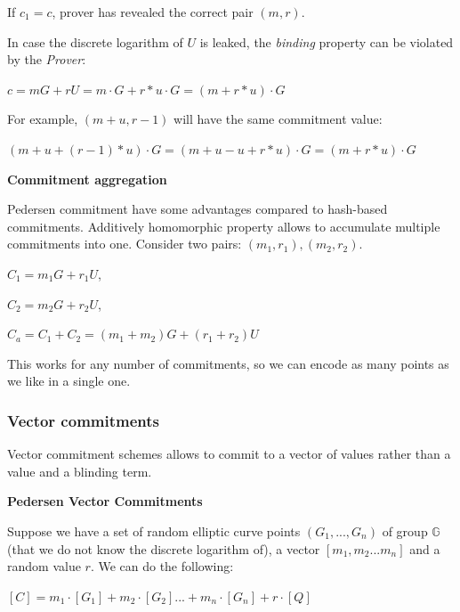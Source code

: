 \documentclass[../lecture-notes.tex]{subfiles}
\begin{document}
If $c_1 = c$, prover has revealed the correct pair $(m, r)$.

\begin{remark}
    In case the discrete logarithm of $U$ is leaked, the \textit{binding} property can be violated by the \textit{Prover}:

    $c = mG + rU = m \cdot G + r*u \cdot G = (m + r*u) \cdot G$
    
    For example, $(m + u, r - 1)$ will have the same commitment value:

    $(m+u + (r-1)*u) \cdot G = (m + u - u + r*u) \cdot G = (m + r*u) \cdot G$ 
        
\end{remark}

\textbf{Commitment aggregation}

Pedersen commitment have some advantages compared to hash-based commitments.
Additively homomorphic property allows to accumulate multiple commitments into one.
Consider two pairs: $(m_1, r_1), (m_2, r_2)$.

\begin{center}
    $C_1 = m_1G + r_1U$,

    $C_2 = m_2G + r_2U$,

    $C_a = C_1 + C_2 = (m_1 + m_2)G + (r_1 + r_2)U$
\end{center}

This works for any number of commitments, so we can encode as many points as we like in a single one.

\vspace{0.5 cm}

\subsubsection{Vector commitments}

Vector commitment schemes allows to commit to a vector of values rather than a value and a blinding term.

\vspace{0.5 cm}

\textbf{Pedersen Vector Commitments}

Suppose we have a set of random elliptic curve points $(G_1,...,G_n)$ of group $\mathbb{G}$ 
(that we do not know the discrete logarithm of), a vector $[m_1, m_2 ... m_n]$ and a random value $r$. We can do the following:

\begin{center}
    $ [C] = m_1\cdot[G_1] + m_2 \cdot [G_2] ... + m_n \cdot [G_n] + r \cdot [Q]$ 
\end{center}
\end{document}
